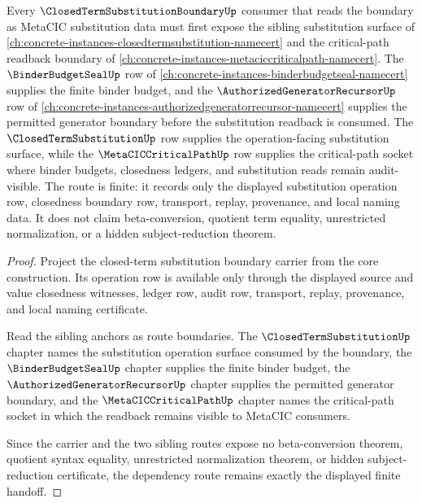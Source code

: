 \begin{theorem}
\label{thm:closed-term-substitution-boundary-sibling-dependency-route}
Every $\ClosedTermSubstitutionBoundaryUp$ consumer that reads the boundary as MetaCIC substitution data must first expose the sibling substitution surface of \autoref{ch:concrete-instances-closedtermsubstitution-namecert} and the critical-path readback boundary of \autoref{ch:concrete-instances-metaciccriticalpath-namecert}. The $\BinderBudgetSealUp$ row of \autoref{ch:concrete-instances-binderbudgetseal-namecert} supplies the finite binder budget, and the $\AuthorizedGeneratorRecursorUp$ row of \autoref{ch:concrete-instances-authorizedgeneratorrecursor-namecert} supplies the permitted generator boundary before the substitution readback is consumed. The $\ClosedTermSubstitutionUp$ row supplies the operation-facing substitution surface, while the $\MetaCICCriticalPathUp$ row supplies the critical-path socket where binder budgets, closedness ledgers, and substitution reads remain audit-visible. The route is finite: it records only the displayed substitution operation row, closedness boundary row, transport, replay, provenance, and local naming data. It does not claim beta-conversion, quotient term equality, unrestricted normalization, or a hidden subject-reduction theorem.
\end{theorem}
\begin{proof}
Project the closed-term substitution boundary carrier from the core construction. Its operation row is available only through the displayed source and value closedness witnesses, ledger row, audit row, transport, replay, provenance, and local naming certificate.

Read the sibling anchors as route boundaries. The $\ClosedTermSubstitutionUp$ chapter names the substitution operation surface consumed by the boundary, the $\BinderBudgetSealUp$ chapter supplies the finite binder budget, the $\AuthorizedGeneratorRecursorUp$ chapter supplies the permitted generator boundary, and the $\MetaCICCriticalPathUp$ chapter names the critical-path socket in which the readback remains visible to MetaCIC consumers.

Since the carrier and the two sibling routes expose no beta-conversion theorem, quotient syntax equality, unrestricted normalization theorem, or hidden subject-reduction certificate, the dependency route remains exactly the displayed finite handoff.
\end{proof}

